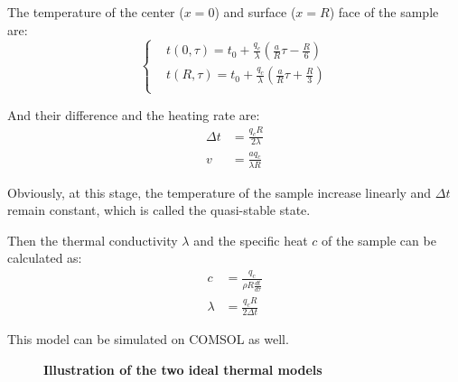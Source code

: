 \documentclass[10pt,a4paper,twocolumn,twoside,UTF8]{article}
\begin{document}
		The temperature of the center ($x=0$) and surface ($x=R$) face of the sample are:
		\begin{equation}
			\left\{
			\begin{aligned}
			&t(0,\tau)=t_0+\frac{q_c}{\lambda}\left(\frac{a}{R}\tau-\frac{R}{6}\right)\\
			&t(R,\tau)=t_0+\frac{q_c}{\lambda}\left(\frac{a}{R}\tau+\frac{R}{3}\right)\\
			\end{aligned}
			\right.
			\label{eq.2.3}
		\end{equation}

		And their difference and the heating rate are:
		\begin{align}
			\Delta t &= \frac{q_cR}{2\lambda} \\
			v &= \frac{a q_c}{\lambda R} \label{eq:1.4}
		\end{align}

		Obviously, at this stage, the temperature of the sample increase linearly and $\Delta t$  remain constant, which is called the quasi-stable state.
		
		Then the thermal conductivity $\lambda$ and the specific heat $c$ of the sample can be calculated as: 
		\begin{align}
			c &=\frac{q_c}{\rho R \frac{dt}{d\tau}} \label{eq:1.5.1} \\
			\lambda &= \frac{q_c R}{2\varDelta t} \label{eq:1.5.2}
		\end{align}

		This model can be simulated on COMSOL as well.

		\begin{figure}[htbp]
			\centering
			\caption{\textbf{Illustration of the two ideal thermal models}}
		\end{figure}
\end{document}
